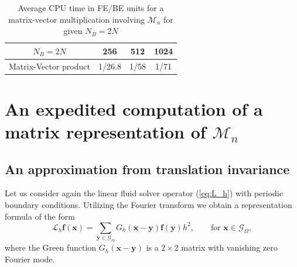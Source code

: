 \documentclass[preprint,12pt]{elsarticle}
\begin{document}
\begin{table}
\begin{center}
\begin{tabular}{|c|c c c|}
\hline
$N_B=2N$ &  256  & 512 & 1024\\
\hline
\textrm{Matrix-Vector product} 
& 1/26.8  & 1/58 &  1/71\\
\hline
\end{tabular}
\end{center}
\caption{Average CPU time in FE/BE units for a matrix-vector multiplication involving $\mathcal{M}_n$ for given $N_B=2N$}
\label{Table:MV}
\end{table}


\section{An expedited computation of a matrix representation of $\mathcal{M}_n$}
\label{Sec:matrix}
\subsection{An approximation from translation invariance}
Let us consider again the linear fluid solver operator (\ref{eq:L_h}) with periodic boundary conditions. Utilizing the Fourier transform we obtain a representation formula of the form
\begin{equation}
 \mathcal{L}_h \mathbf{f}(\mathbf{x}) = \sum_{\mathbf{y} \in \mathcal{G}_\Omega} G_h (\mathbf{x}-\mathbf{y})\mathbf{f}(\mathbf{y})h^2, \qquad \text{for $\mathbf{x} \in \mathcal{G}_\Omega$},
\label{eq:G_h}
\end{equation}
where the Green function $ G_h (\mathbf{x}-\mathbf{y})$ is a $2 \times 2$ matrix with vanishing zero Fourier mode. 
\end{document}
